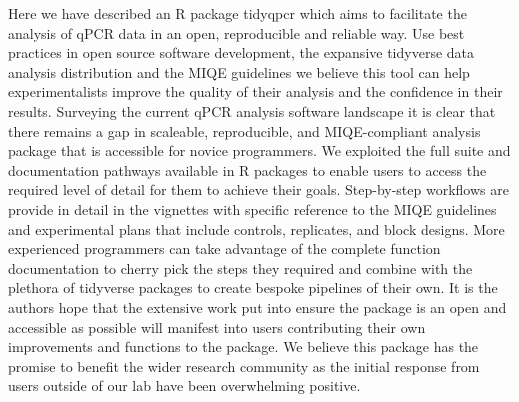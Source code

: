 \documentclass{SBCbookchapter}
\begin{document}
Here we have described an R package tidyqpcr which aims to facilitate the analysis of qPCR data in an open, reproducible and reliable way. Use best practices in open source software development, the expansive tidyverse data analysis distribution and the MIQE guidelines we believe this tool can help experimentalists improve the quality of their analysis and the confidence in their results. Surveying the current qPCR analysis software landscape it is clear that there remains a gap in scaleable, reproducible, and MIQE-compliant analysis package that is accessible for novice programmers. We exploited the full suite and documentation pathways available in R packages to enable users to access the required level of detail for them to achieve their goals. Step-by-step workflows are provide in detail in the vignettes with specific reference to the MIQE guidelines and experimental plans that include controls, replicates, and block designs. More experienced programmers can take advantage of the complete function documentation to cherry pick the steps they required and combine with the plethora of tidyverse packages to create bespoke pipelines of their own. It is the authors hope that the extensive work put into ensure the package is an open and accessible as possible will manifest into users contributing their own improvements and functions to the package. We believe this package has the promise to benefit the wider research community as the initial response from users outside of our lab have been overwhelming positive.

%
%
\end{document}
